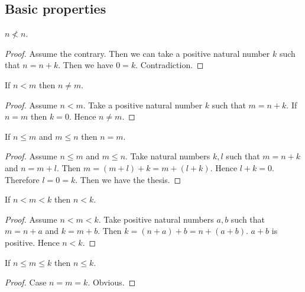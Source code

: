 \documentclass[../../arithmetic.ftl.tex]{subfiles}
\begin{document}
  \subsection{Basic properties}

  \begin{forthel}
    \begin{proposition}\label{Arithmetic_02_01_659871}
      $n \nless n$.
    \end{proposition}
    \begin{proof}
      Assume the contrary.
      Then we can take a positive natural number $k$ such that $n = n + k$.
      Then we have $0 = k$.
      Contradiction.
    \end{proof}


    \begin{proposition}\label{Arithmetic_02_01_679789}
      If $n < m$ then $n \neq m$.
    \end{proposition}
    \begin{proof}
      Assume $n < m$.
      Take a positive natural number $k$ such that $m = n + k$.
      If $n = m$ then $k = 0$.
      Hence $n \neq m$.
    \end{proof}


    \begin{proposition}\label{Arithmetic_02_01_710123}
      If $n \leq m$ and $m \leq n$ then $n = m$.
    \end{proposition}
    \begin{proof}
      Assume $n \leq m$ and $m \leq n$.
      Take natural numbers $k,l$ such that $m = n + k$ and $n = m + l$.
      Then $m = (m + l) + k = m + (l + k)$.
      Hence $l + k = 0$.
      Therefore $l = 0 = k$.
      Then we have the thesis.
    \end{proof}


    \begin{proposition}\label{Arithmetic_02_01_662806}
      If $n < m < k$ then $n < k$.
    \end{proposition}
    \begin{proof}
      Assume $n < m < k$.
      Take positive natural numbers $a,b$ such that $m = n + a$ and $k = m + b$.
      Then $k = (n + a) + b = n + (a + b)$.
      $a + b$ is positive.
      Hence $n < k$.
    \end{proof}


    \begin{proposition}\label{Arithmetic_02_01_394529}
      If $n \leq m \leq k$ then $n \leq k$.
    \end{proposition}
    \begin{proof}
      Case $n = m = k$. Obvious.


\end{proof}
\end{forthel}
\end{document}
